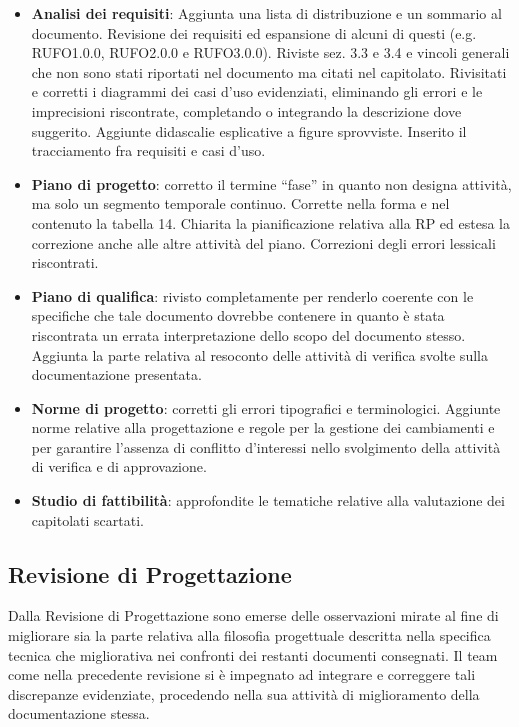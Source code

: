\begin{itemize}
\item \textbf{Analisi dei requisiti}: Aggiunta una lista di distribuzione e un sommario al documento. Revisione dei requisiti ed espansione di alcuni di questi (e.g. RUFO1.0.0, RUFO2.0.0 e RUFO3.0.0). Riviste sez. 3.3 e 3.4 e vincoli generali che non sono stati riportati nel documento ma citati nel capitolato. Rivisitati e corretti i diagrammi dei casi d'uso evidenziati, eliminando gli errori e le imprecisioni riscontrate, completando o integrando la descrizione dove suggerito. Aggiunte didascalie esplicative a figure sprovviste. Inserito il tracciamento fra requisiti e casi d'uso.

\item \textbf{Piano di progetto}: corretto il termine ``fase'' in quanto non designa attività, ma solo un segmento temporale continuo. Corrette nella forma e nel contenuto la tabella 14. Chiarita la pianificazione relativa alla \underline{} RP ed estesa la correzione anche alle altre attività del piano. Correzioni degli errori lessicali riscontrati.

\item \textbf{Piano di qualifica}: rivisto completamente per renderlo coerente con le specifiche che tale documento dovrebbe contenere in quanto è stata riscontrata un errata interpretazione dello scopo del documento stesso.
Aggiunta la parte relativa al resoconto delle attività di verifica svolte sulla documentazione presentata.

\item \textbf{Norme di progetto}: corretti gli errori tipografici e terminologici. Aggiunte norme relative alla progettazione e regole per la gestione dei cambiamenti e per garantire l'assenza di conflitto d'interessi nello svolgimento della attività di verifica e di approvazione.

\item \textbf{Studio di fattibilità}: approfondite le tematiche relative alla valutazione dei capitolati scartati.
\end{itemize}

\subsection{Revisione di Progettazione}
Dalla Revisione di Progettazione sono emerse delle osservazioni mirate al fine di migliorare sia la parte relativa alla filosofia progettuale descritta nella specifica tecnica che migliorativa nei confronti dei restanti documenti consegnati. Il team come nella precedente revisione si è impegnato ad integrare e correggere tali discrepanze evidenziate, procedendo nella sua attività di miglioramento della documentazione stessa.

